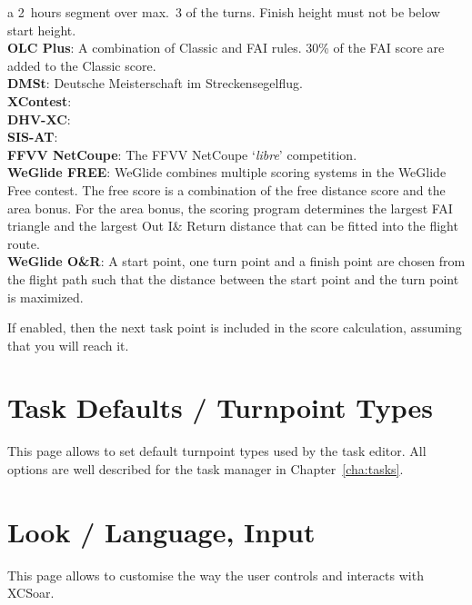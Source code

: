 \begin{description}
  a 2~hours segment over max.\ 3 of the turns. Finish height must not be below
  start height. \\
  {\bf OLC Plus}: A combination of Classic and FAI rules. 30\% of the FAI score
  are added to the Classic score. \\
  {\bf DMSt}: Deutsche Meisterschaft im Streckensegelflug. \\
  {\bf XContest}:  \\
  {\bf DHV-XC}:  \\
  {\bf SIS-AT}:  \\
  {\bf FFVV NetCoupe}: The FFVV NetCoupe `{\it libre}' competition. \\
  {\bf WeGlide FREE}: WeGlide combines multiple scoring systems in the WeGlide Free contest. The free score is a combination of the free distance score and the area bonus. For the area bonus, the scoring program determines the largest FAI triangle and the largest Out I\& Return distance that can be fitted into the flight route. \\
  {\bf WeGlide O\&R}: A start point, one turn point and a finish point are chosen from the flight path such that the distance between the start point and the turn point is maximized. \\
\item[Predict Contest]  If enabled, then the next task point is included in the 
  score calculation, assuming that you will reach it.
\end{description}

\section{Task Defaults / Turnpoint Types}

This page allows to set default turnpoint types used by the task editor. All 
options are well described for the task manager in Chapter~\ref{cha:tasks}.


\section{Look / Language, Input}\label{sec:interface}

This page allows to customise the way the user controls and interacts with
XCSoar.

